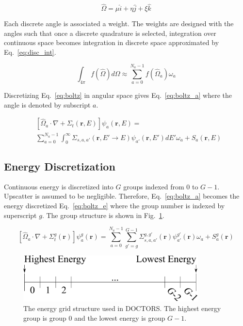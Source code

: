 \begin{equation} \label{eq:omega_cos}
	\hat{\Omega} = \mu \hat{i} + \eta \hat{j} + \xi \hat{k}
\end{equation}

Each discrete angle is associated a weight. The weights are designed with the angles such that once a discrete quadrature is selected, integration over continuous space becomes integration in discrete space approximated by Eq.~\ref{eq:disc_int}.

\begin{equation} \label{eq:disc_int}
\int_{4 \pi} f(\hat{\Omega}) d\Omega \approx \sum_{a=0}^{N_a-1} f(\hat{\Omega}_a) \omega_a
\end{equation}

Discretizing Eq.~\ref{eq:boltz} in angular space gives Eq.~\ref{eq:boltz_a} where the angle is denoted by subscript $a$.

\begin{equation} \label{eq:boltz_a}
\begin{split}
&\left[ \hat{\Omega}_a \cdot \nabla + \Sigma_t(\boldsymbol{r}, E) \right]
\psi_{a}(\boldsymbol{r}, E) = \\
&\sum_{a=0}^{N_a-1} \int_0^\infty \Sigma_{s, a, a'}(\boldsymbol{r}, E' \rightarrow E) \psi_{a'}(\boldsymbol{r}, E') dE' \omega_a + S_a(\boldsymbol{r}, E)
\end{split}
\end{equation}

\subsection{Energy Discretization}

Continuous energy is discretized into $G$ groups indexed from 0 to $G-1$. Upscatter is assumed to be negligible. Therefore, Eq.~\ref{eq:boltz_a} becomes the energy discretized Eq.~\ref{eq:boltz_e} where the group number is indexed by superscript $g$. The group structure is shown in Fig.~\ref{fig:energy_groups}.

\begin{equation} \label{eq:boltz_e}
\left[ \hat{\Omega}_a \cdot \nabla + \Sigma_t^g(\boldsymbol{r}) \right]
\psi_{a}^{g}(\boldsymbol{r}) = 
\sum_{a=0}^{N_a-1} \sum_{g'=g}^{G-1} \Sigma_{s, a, a'}^{g, g'}(\boldsymbol{r}) \psi_{a'}^{g'}(\boldsymbol{r}) \omega_a + S_a^g(\boldsymbol{r})
\end{equation}

\begin{figure}[tb]
  \begin{center}
   \includegraphics[width=3.75in]{figs/energy_groups}
  \end{center}
  \caption{The energy grid structure used in DOCTORS. The highest energy group is group 0 and the lowest energy is group $G-1$.}
\label{fig:energy_groups}
\end{figure}%

